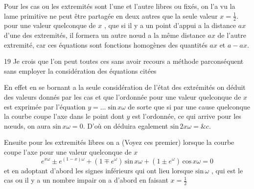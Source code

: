 \documentclass[11pt,a4paper]{article}
\begin{document}
 Pour les cas ou les extremités sont l'une et l'autre
libres ou fixés, on l'a vu   la lame primitive
ne peut être  partagée en deux autres que  la
seule valeur $x=\frac{1}{2}$.   pour une valeur quelconque de
$x$ , que si il y a un point d'appui
a la distance $ax$ d'une des extremités, il  formera un
autre nœud a la même distance $ax$ de l'autre extremité, car ces
équations sont fonctions homogènes des quantités $ax$ et $a-ax$.

19 Je crois que l'on peut   toutes ces   sans avoir
recours a   méthode   parconséquent sans employer la
considération des équations citées

En effet en se bornant a la seule considération de
l'état des extrémités \struck{\ill{}}   
 on déduit des valeurs donnés par les cas et
que l'ordonnée pour une valeur quelconque de $x$ est
exprimée par l'équation $y = \dots \; \text{sin}\,x\omega$ de sorte que si par
une cause quelconque la courbe coupe l'axe dans le point
dont $y$ est l'ordonnée, ce qui arrive pour les nœuds,
on aura $\text{sin}\,x\omega = 0$. D'où on déduira egalement $\text{sin}\,2x\omega = \&c.$

Ensuite pour les extremités libres on a (Voyez ces premier)
lorsque la courbe coupe l'axe pour une valeur quelconque de $x$
\[ e^{x\omega} \pm e^{(1-x)\omega} + (1 \mp e^{\omega})\,\text{sin}\,x\omega + (1 \pm e^{\omega})\,\text{cos}\,x\omega = 0 \]
et en adoptant d'abord les signes inférieurs qui ont lieu lorsque
$\text{sin}\,\omega$ , qui est le cas ou il y a un nombre
impair on a d'abord en faisant $x=\frac{1}{2}$
\end{document}
